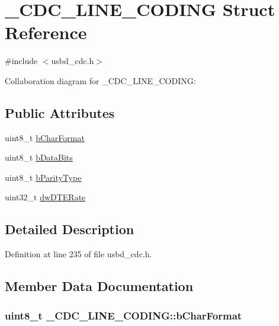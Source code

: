 \hypertarget{struct__CDC__LINE__CODING}{}\section{\+\_\+\+C\+D\+C\+\_\+\+L\+I\+N\+E\+\_\+\+C\+O\+D\+I\+NG Struct Reference}
\label{struct__CDC__LINE__CODING}


{\ttfamily \#include $<$usbd\+\_\+cdc.\+h$>$}



Collaboration diagram for \+\_\+\+C\+D\+C\+\_\+\+L\+I\+N\+E\+\_\+\+C\+O\+D\+I\+NG\+:
\subsection*{Public Attributes}
\begin{DoxyCompactItemize}
\item 
uint8\+\_\+t \hyperlink{struct__CDC__LINE__CODING_a5c0251985f51927746b57e4c800ae9c7}{b\+Char\+Format}
\item 
uint8\+\_\+t \hyperlink{struct__CDC__LINE__CODING_a6764726aafd5b442bf5a1ecb39ffeb96}{b\+Data\+Bits}
\item 
uint8\+\_\+t \hyperlink{struct__CDC__LINE__CODING_a737b276dd2599610b3cf4783c80e725c}{b\+Parity\+Type}
\item 
uint32\+\_\+t \hyperlink{struct__CDC__LINE__CODING_aeca9d053bfd185bc6b70911197442398}{dw\+D\+T\+E\+Rate}
\end{DoxyCompactItemize}


\subsection{Detailed Description}


Definition at line 235 of file usbd\+\_\+cdc.\+h.



\subsection{Member Data Documentation}
\subsubsection[{\texorpdfstring{b\+Char\+Format}{bCharFormat}}]{\setlength{\rightskip}{0pt plus 5cm}uint8\+\_\+t \+\_\+\+C\+D\+C\+\_\+\+L\+I\+N\+E\+\_\+\+C\+O\+D\+I\+N\+G\+::b\+Char\+Format}\hypertarget{struct__CDC__LINE__CODING_a5c0251985f51927746b57e4c800ae9c7}{}\label{struct__CDC__LINE__CODING_a5c0251985f51927746b57e4c800ae9c7}


